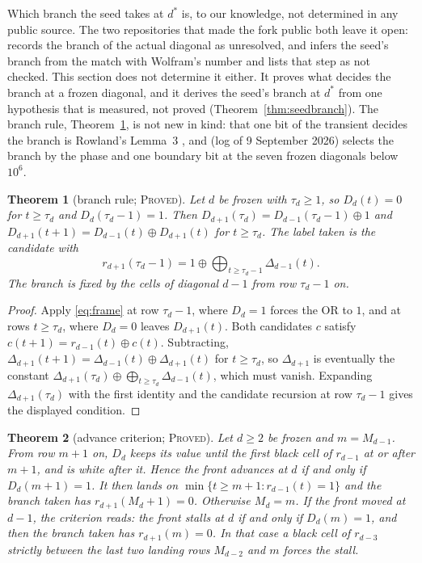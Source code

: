 \documentclass[11pt]{article}
\newtheorem{theorem}{Theorem}[section]
\theoremstyle{definition}
\theoremstyle{remark}
\newcommand{\PROVED}{\textsc{Proved}}
\newcommand{\dstar}{d^{*}}
\begin{document}
Which branch the seed takes at $\dstar$ is, to our knowledge, not determined in any public source. The two repositories that made the fork public both leave it open: \cite{Pat} records the branch of the actual diagonal as unresolved, and \cite{Dib} infers the seed's branch from the match with Wolfram's number and lists that step as not checked. This section does not determine it either. It proves what decides the branch at a frozen diagonal, and it derives the seed's branch at $\dstar$ from one hypothesis that is measured, not proved (Theorem~\ref{thm:seedbranch}). The branch rule, Theorem~\ref{thm:branch}, is not new in kind: that one bit of the transient decides the branch is Rowland's Lemma~3 \cite{Rowland}, and \cite{Pat} (log of 9 September 2026) selects the branch by the phase and one boundary bit at the seven frozen diagonals below $10^6$.

\begin{theorem}[branch rule; \PROVED]\label{thm:branch}
Let $d$ be frozen with $\tau_d\ge1$, so $D_d(t)=0$ for $t\ge\tau_d$ and $D_d(\tau_d-1)=1$. Then $D_{d+1}(\tau_d)=D_{d-1}(\tau_d-1)\oplus1$ and $D_{d+1}(t+1)=D_{d-1}(t)\oplus D_{d+1}(t)$ for $t\ge\tau_d$. The label taken is the candidate with
\[
r_{d+1}(\tau_d-1)=1\oplus\bigoplus_{t\ge\tau_d-1}\Delta_{d-1}(t).
\]
The branch is fixed by the cells of diagonal $d-1$ from row $\tau_d-1$ on.
\end{theorem}

\begin{proof}
Apply \eqref{eq:frame} at row $\tau_d-1$, where $D_d=1$ forces the OR to $1$, and at rows $t\ge\tau_d$, where $D_d=0$ leaves $D_{d+1}(t)$. Both candidates $c$ satisfy $c(t+1)=r_{d-1}(t)\oplus c(t)$. Subtracting, $\Delta_{d+1}(t+1)=\Delta_{d-1}(t)\oplus\Delta_{d+1}(t)$ for $t\ge\tau_d$, so $\Delta_{d+1}$ is eventually the constant $\Delta_{d+1}(\tau_d)\oplus\bigoplus_{t\ge\tau_d}\Delta_{d-1}(t)$, which must vanish. Expanding $\Delta_{d+1}(\tau_d)$ with the first identity and the candidate recursion at row $\tau_d-1$ gives the displayed condition.
\end{proof}

\begin{theorem}[advance criterion; \PROVED]\label{thm:advance}
Let $d\ge2$ be frozen and $m=M_{d-1}$. From row $m+1$ on, $D_d$ keeps its value until the first black cell of $r_{d-1}$ at or after $m+1$, and is white after it. Hence the front advances at $d$ if and only if $D_d(m+1)=1$. It then lands on $\min\{t\ge m+1:r_{d-1}(t)=1\}$ and the branch taken has $r_{d+1}(M_d+1)=0$. Otherwise $M_d=m$.
If the front moved at $d-1$, the criterion reads: the front stalls at $d$ if and only if $D_d(m)=1$, and then the branch taken has $r_{d+1}(m)=0$. In that case a black cell of $r_{d-3}$ strictly between the last two landing rows $M_{d-2}$ and $m$ forces the stall.
\end{theorem}
\end{document}
